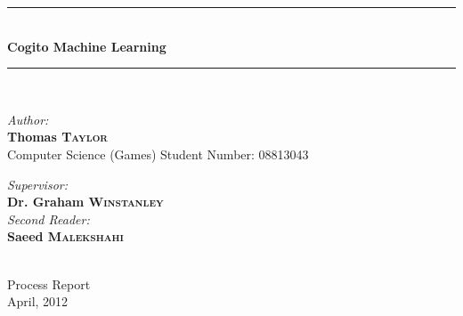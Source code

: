 \documentclass[runningheads,a4paper]{llncs}
\begin{document}
\newcommand{\HRule}{\rule{\linewidth}{0.5mm}}
\newcommand{\HRuleLight}{\rule{\linewidth}{0.1mm}}

\mainmatter  

%
%

\begin{titlepage}
\begin{center}


\HRule \\[0.75cm]

{\Huge \bfseries Cogito Machine Learning}\\[0.35cm]
\HRule\\[0.5cm]

\begin{minipage}{0.45\textwidth}
	\begin{flushleft}\large
		\emph{Author:}\\
			\textbf{Thomas \textsc{Taylor}}\\[0.27cm]
			Computer Science (Games)
			Student Number: 08813043
	\end{flushleft}
\end{minipage}
\begin{minipage}{0.43\textwidth}
	\begin{flushright} \large
		\emph{Supervisor:} \\
		\textbf{Dr. Graham \textsc{Winstanley}}\\[0.25cm]
		\emph{Second Reader:}\\
		\textbf{Saeed \textsc{Malekshahi}}
	\end{flushright}
\end{minipage}\\[0.75cm] 




\vfill
\huge Process Report\\
{\large April, 2012}\\

\end{center}
\end{titlepage}
\end{document}
